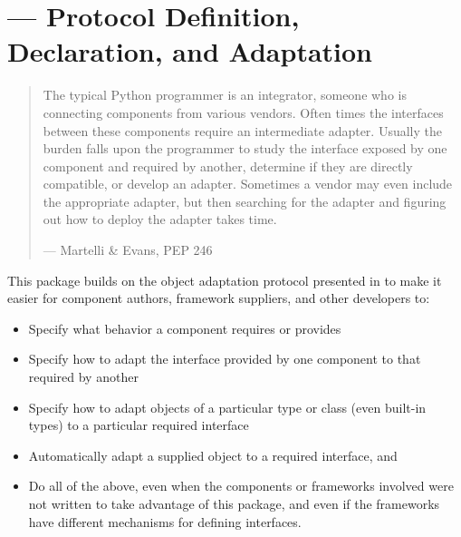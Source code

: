 \section{ ---
         Protocol Definition, Declaration, and Adaptation}

\begin{quotation}
The typical Python programmer is an integrator, someone who is
connecting components from various vendors.  Often times the
interfaces between these components require an intermediate
adapter.  Usually the burden falls upon the programmer to
study the interface exposed by one component and required by
another, determine if they are directly compatible, or develop
an adapter.  Sometimes a vendor may even include the
appropriate adapter, but then searching for the adapter and
figuring out how to deploy the adapter takes time.

\hfill --- Martelli \& Evans, PEP 246
\end{quotation}

This package builds on the object adaptation protocol presented in 
to make it easier for component authors, framework suppliers, and other
developers to:

\begin{itemize}

\item Specify what behavior a component requires or provides

\item Specify how to adapt the interface provided by one component to that
required by another

\item Specify how to adapt objects of a particular type or class (even
built-in types) to a particular required interface

\item Automatically adapt a supplied object to a required interface, and

\item Do all of the above, even when the components or frameworks involved
were not written to take advantage of this package, and even if the frameworks
have different mechanisms for defining interfaces.

\end{itemize}

